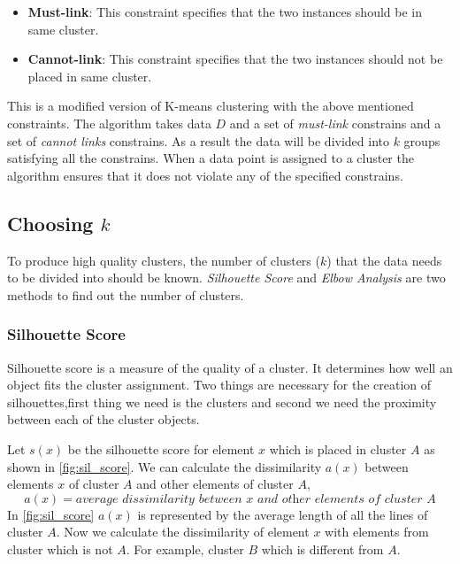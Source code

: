 \begin{itemize}
    \item \textbf{Must-link}: This constraint specifies that the two instances should be in same cluster.
    \item \textbf{Cannot-link}: This constraint specifies that the two instances should not be placed in same cluster.
\end{itemize}

This is a modified version of K-means clustering with the above mentioned constraints. The algorithm takes data $D$ and a set of \textit{must-link} constrains and a set of \textit{cannot links} constrains. As a result the data will be divided into $k$ groups satisfying all the constrains. When a data point is assigned to a cluster the algorithm ensures that it does not violate any of the specified constrains.



\subsection{Choosing $k$} \label{chooseK}
To produce high quality clusters, the number of clusters ($k$) that the data needs to be divided into should be known. \textit{Silhouette Score} \cite{rousseeuw1987silhouettes} and \textit{Elbow Analysis} \cite{thorndike1953belongs,ketchen1996application}  are two methods to find out the number of clusters.

\subsubsection{Silhouette Score}
Silhouette score is a measure of the quality of a cluster. It determines how well an object fits the cluster assignment. Two things are necessary for the creation of silhouettes,first thing we need is the clusters and second we need the proximity between each of the cluster objects.

Let $s(x)$ be the silhouette score for element $x$ which is placed in cluster $A$ as shown in \ref{fig:sil_score}. We can calculate the dissimilarity $a(x)$ between elements $x$ of cluster $A$ and other elements of cluster $A$,
\begin{equation}\label{eq:sil_1}
    a(x) = \textit{average dissimilarity between x and other elements of cluster A}
\end{equation}
In \ref{fig:sil_score} $a(x)$ is represented by the average length of all the lines of cluster $A$. Now we calculate the dissimilarity of element $x$ with elements from cluster which is not $A$. For example, cluster $B$ which is different from $A$.

